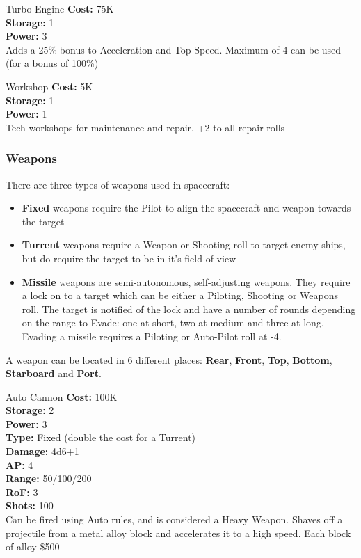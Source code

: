 \begin{multicols}{2}
\begin{genericsection}{Turbo Engine}
\textbf{Cost:} 75K\\
\textbf{Storage:} 1\\
\textbf{Power:} 3\\
Adds a 25\% bonus to Acceleration and Top Speed. Maximum of 4 can be used (for a bonus of 100\%)
\end{genericsection}

\begin{genericsection}{Workshop}
\textbf{Cost:} 5K\\
\textbf{Storage:} 1\\
\textbf{Power:} 1\\
Tech workshops for maintenance and repair. +2 to all repair rolls
\end{genericsection}

\subsubsection{Weapons}

There are three types of weapons used in spacecraft:

\begin{itemize}
  \item \textbf{Fixed} weapons require the Pilot to align the spacecraft and weapon towards the target
  \item \textbf{Turrent} weapons require a Weapon or Shooting roll to target enemy ships, but do require the target to be in it's field of view
  \item \textbf{Missile} weapons are semi-autonomous, self-adjusting weapons. They require a lock on to a target which can be either a Piloting, Shooting or Weapons roll. The target is notified of the lock and have a number of rounds depending on the range to Evade: one at short, two at medium and three at long. Evading a missile requires a Piloting or Auto-Pilot roll at -4.
\end{itemize}

A weapon can be located in 6 different places: \textbf{Rear}, \textbf{Front}, \textbf{Top}, \textbf{Bottom}, \textbf{Starboard} and \textbf{Port}.

\begin{genericsection}{Auto Cannon}
\textbf{Cost:} 100K\\
\textbf{Storage:} 2\\
\textbf{Power:} 3\\
\textbf{Type:} Fixed (double the cost for a Turrent)\\
\textbf{Damage:} 4d6+1\\
\textbf{AP:} 4\\
\textbf{Range:} 50/100/200\\
\textbf{RoF:} 3\\
\textbf{Shots:} 100\\
Can be fired using Auto rules, and is considered a Heavy Weapon. Shaves off a projectile from a metal alloy block and accelerates it to a high speed. Each block of alloy \$500
\end{genericsection}


\end{multicols}
